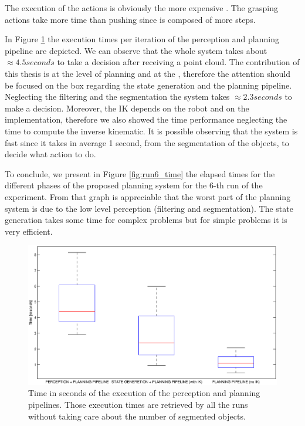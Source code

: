 The execution of the actions is obviously the more expensive . The grasping actions take more time than pushing since  is composed of more steps.

In Figure \ref{fig:pipeline} the execution times per iteration of the perception and planning pipeline are depicted. We can observe that the whole system takes about $\approx 4.5 seconds$ to take a decision after receiving a point cloud. The contribution of this thesis is at the level of planning and at the , therefore the attention should be focused on the box regarding the state generation and the planning pipeline. Neglecting the filtering and the segmentation the system takes $\approx 2.3 seconds$ to make a decision. Moreover, the IK depends on the robot and on the implementation, therefore we also showed the time performance neglecting the time to compute the inverse kinematic. It is possible observing that the system is fast since it takes in average 1 second, from the segmentation of the objects, to decide what action to do. 


To conclude, we present in Figure \ref{fig:run6_time} the elapsed times for the different phases of the proposed planning system for the $6$-th run of the experiment. From that graph is appreciable that the worst part of the planning system is due to the low level perception (filtering and segmentation). The state generation takes some time for complex problems but for simple problems it is very efficient. 


\begin{figure}
\centering
\includegraphics[width=16cm]{Img/experiments/exp_good/data/pipeline.eps}
\caption{Time in seconds of the execution of the perception and planning pipelines. Those execution times are retrieved by all the runs without taking care about the number of segmented objects.}\label{fig:pipeline}
\end{figure}

